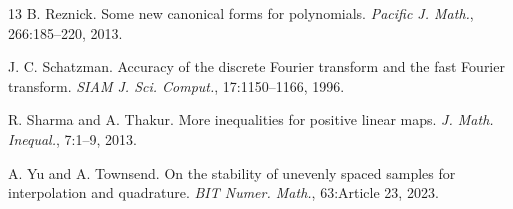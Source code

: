 \documentclass[UTF8,a4paper,zihao=-4,fontset=windows]{ctexart}
\theoremstyle{chinese}
\numberwithin{equation}{section}
\begin{document}
\begin{thebibliography}{13}
B. Reznick.
Some new canonical forms for polynomials.
\emph{Pacific J. Math.}, 266:185--220, 2013.

J. C. Schatzman.
Accuracy of the discrete Fourier transform and the
fast Fourier transform.
\emph{SIAM J. Sci. Comput.}, 17:1150--1166, 1996.

R. Sharma and A. Thakur.
More inequalities for positive linear maps.
\emph{J. Math. Inequal.}, 7:1--9, 2013.

A. Yu and A. Townsend.
On the stability of unevenly spaced samples
for interpolation and quadrature. \emph{BIT Numer. Math.}, 63:Article 23, 2023.

\end{thebibliography}
\endgroup
\end{document}
